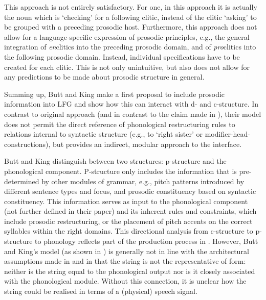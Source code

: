 \documentclass[output=paper,hidelinks]{langscibook}
\begin{document}
This approach is not entirely satisfactory. For one, in this approach it is actually the noun which is `checking' for a following clitic, instead of the clitic `asking' to be grouped with a preceding prosodic host. Furthermore, this approach does not allow for a language-specific expression of prosodic principles, e.g., the general integration of {\em en}clitics into the preceding prosodic domain, and of {\em pro}clitics into the following prosodic domain. Instead, individual specifications have to be created for each clitic. This is not only unintuitive, but also does not allow for any predictions to be made about prosodic structure in general. 

Summing up, Butt and King make a first proposal to include prosodic information into LFG and show how this can interact with d- and c-structure. In contrast to  original approach (and in contrast to the claim made in \citealt{DLM:LFG}), their model does not permit the direct reference of phonological restructuring rules to relations internal to syntactic structure (e.g., to `right sister' or modifier-head-constructions), but provides an indirect, modular approach to the interface.

Butt and King distinguish between two structures: p-structure and the phonological component. P-structure only includes the information that is pre-deter\-mined by other modules of grammar, e.g., pitch patterns introduced by different sentence types and focus, and prosodic constituency based on syntactic constituency. This information serves as input to the phonological component (not further defined in their paper) and its inherent rules and constraints, which include prosodic restructuring, or the placement of pitch accents on the correct syllables within the right domains. %
This directional analysis from c-structure to p-structure to phonology reflects part of the production process in . However, Butt and King's model (as shown in ) is generally not in line with the architectural assumptions made in  and  in that the string is not the representative of {\sc form}: neither is the string equal to the phonological output nor is it closely associated with the phonological module. Without this connection, it is unclear how the string could be realised in terms of a (physical) speech signal.

\end{document}
